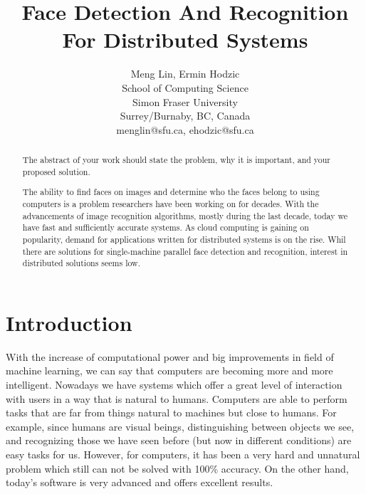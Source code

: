 \documentclass[11pt, draftclsnofoot, onecolumn]{IEEEtran}
\begin{document}
\title{Face Detection And Recognition For Distributed Systems}

\author{Meng Lin, Ermin Hodzic\\
        School of Computing Science\\
        Simon Fraser University\\
        Surrey/Burnaby, BC, Canada \\
        menglin@sfu.ca, ehodzic@sfu.ca  \\ 
}



\date{}
\maketitle

\begin{abstract}

The abstract of your work should state the problem, why it is important, 
and your proposed solution.

The ability to find faces on images and determine who the faces belong to using computers is a problem researchers have been working on for decades. With the advancements of image recognition algorithms, mostly during the last decade, today we have fast and sufficiently accurate systems. As cloud computing is gaining on popularity, demand for applications written for distributed systems is on the rise. Whil there are solutions for single-machine parallel face detection and recognition, interest in distributed solutions seems low.

\end{abstract}


\section{Introduction} \label{sec:introduction}

With the increase of computational power and big improvements in field of machine learning, we can say that computers are becoming more and more intelligent. Nowadays we have systems which offer a great level of interaction with users in a way that is natural to humans. Computers are able to perform tasks that are far from things natural to machines but close to humans. For example, since humans are visual beings, distinguishing between objects we see, and recognizing those we have seen before (but now in different conditions) are easy tasks for us. However, for computers, it has been a very hard and unnatural problem which still can not be solved with 100\% accuracy. On the other hand, today's software is very advanced and offers excellent results.
\end{document}
